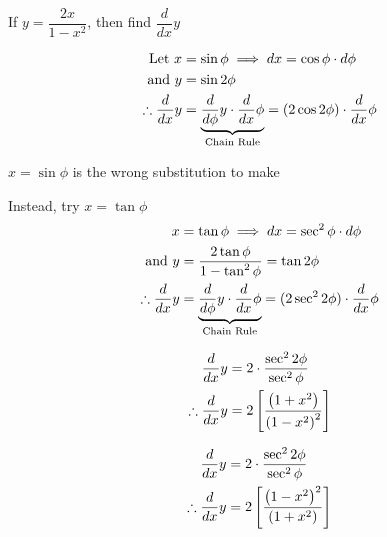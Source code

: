 \documentclass[14pt,fleqn]{extarticle}
\newcommand\msq{\left(1-x^2 \right)}
\newcommand\psq{\left(1+x^2 \right)}
\begin{document}
 
\begin{problem}
	\statement 
    
    If $y = \dfrac{2x}{1-x^2}$, then find $\dfrac{d}{dx}y$ 
    
    \begin{step}
  \begin{options} 
       
     \incorrect
     
     \begin{align}
	\text{Let } x &= \sin\phi \implies dx = \cos\phi\cdot d \phi \\
	\text{and } y &= \sin 2\phi \\
	\therefore \frac{d}{dx} y &= \underbrace{\frac{d}{d\phi} y \cdot \frac{d}{dx} \phi}_{\text{Chain Rule}} = (2\cos2\phi)\cdot \frac{d}{dx} \phi
\end{align}
    \end{options} 
     \reason 
     
     $x=\sin\phi$ is the wrong substitution to make \newline 
     
     Instead, try $x = \tan\phi$ 
     \begin{align}
     x &= \tan\phi \implies dx = \sec^2\phi\cdot d\phi \\
     \text{and } y &= \frac{2\tan\phi}{1-\tan^2\phi} = \tan 2\phi \\
     \therefore \frac{d}{dx} y &= \underbrace{\frac{d}{d\phi}y\cdot \frac{d}{dx} \phi}_{\text{Chain Rule}} = (2\sec^2 2\phi)\cdot \frac{d}{dx}\phi 
\end{align}
       
\end{step} 

\begin{step}
  \begin{options} 
     \correct 

\begin{align}
	\ddx y &= 2\cdot \dfrac{\sec^2 2\phi}{\sec^2\phi} \\
	\therefore \ddx y &= 2 \left[\dfrac{\psq}{\msq^2} \right]
\end{align}       

     \incorrect

\begin{align}
	\ddx y &= 2\cdot \dfrac{\sec^2 2\phi}{\sec^2\phi} \\
	\therefore \ddx y &= 2 \left[\dfrac{\msq^2}{\psq} \right]
\end{align}
        
    \end{options} 
     \reason 
       

\end{step}
\end{problem}
\end{document}
